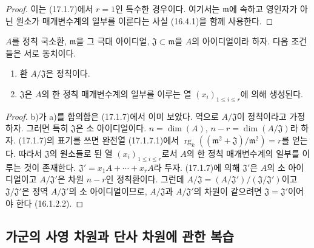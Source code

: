 \begin{proof}
이는 (17.1.7)에서 $r=1$인 특수한 경우이다. 여기서는
$\mathfrak{m}$에 속하고 영인자가 아닌 원소가 매개변수계의 일부를
이룬다는 사실 (16.4.1)을 함께 사용한다.
\end{proof}

\begin{corollary}[17.1.9]
\label{0.17.1.9-fr}
$A$를 정칙 국소환, $\mathfrak{m}$을 그 극대 아이디얼,
$\mathfrak{J}\subset\mathfrak{m}$을 $A$의 아이디얼이라 하자. 다음
조건들은 서로 동치이다.
\begin{enumerate}
  \item[\rm a)] 환 $A/\mathfrak{J}$은 정칙이다.
  \item[\rm b)] $\mathfrak{J}$은 $A$의 한 정칙 매개변수계의 일부를
  이루는 열 $(x_i)_{1\leq i\leq r}$에 의해 생성된다.
\end{enumerate}
\end{corollary}

\begin{proof}
b)가 a)를 함의함은 (17.1.7)에서 이미 보았다. 역으로
$A/\mathfrak{J}$이 정칙이라고 가정하자. 그러면 특히
$\mathfrak{J}$은 소 아이디얼이다. $n=\dim(A)$,
$n-r=\dim(A/\mathfrak{J})$라 하자. (17.1.7)의 표기를 쓰면 완전열
(17.1.7.1)에서
$\operatorname{rg}_k((\mathfrak{m}^2+\mathfrak{J})/
\mathfrak{m}^2)=r$를 얻는다. 따라서 $\mathfrak{J}$의 원소들로 된 열
$(x_i)_{1\leq i\leq r}$로서 $A$의 한 정칙 매개변수계의 일부를 이루는
것이 존재한다. $\mathfrak{J}'=x_1A+\cdots+x_rA$라 두자. (17.1.7)에
의해 $\mathfrak{J}'$은 $A$의 소 아이디얼이고
$A/\mathfrak{J}'$은 차원 $n-r$인 정칙환이다. 그런데
$A/\mathfrak{J}=(A/\mathfrak{J}')/(\mathfrak{J}/\mathfrak{J}')$이고
$\mathfrak{J}/\mathfrak{J}'$은 정역 $A/\mathfrak{J}'$의 소
아이디얼이므로, $A/\mathfrak{J}$과 $A/\mathfrak{J}'$의 차원이 같으려면
$\mathfrak{J}=\mathfrak{J}'$이어야 한다 (16.1.2.2).
\end{proof}

\subsection{가군의 사영 차원과 단사 차원에 관한 복습}
\label{subsection:0.17.2-fr}

